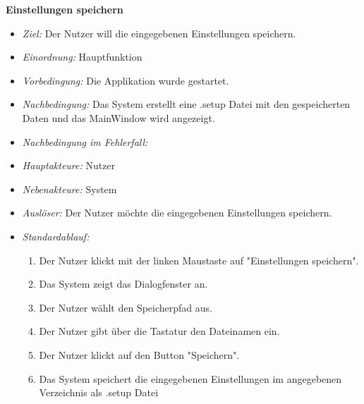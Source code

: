 \textbf{Einstellungen speichern}
  \begin{itemize}
  \item \textit{Ziel:} Der Nutzer will die eingegebenen Einstellungen speichern.
  \item \textit{Einordnung:} Hauptfunktion
  \item \textit{Vorbedingung:} Die Applikation wurde gestartet.
  \item \textit{Nachbedingung:} Das System erstellt eine .setup Datei mit den gespeicherten Daten und das MainWindow wird angezeigt.
    \item \textit{Nachbedingung im Fehlerfall:}
  \item \textit{Hauptakteure:} Nutzer
  \item \textit{Nebenakteure:} System
  \item \textit{Ausl\"oser:} Der Nutzer m\"ochte die eingegebenen Einstellungen speichern.
    \item \textit{Standardablauf:}
    \begin{enumerate}
    \item Der Nutzer klickt mit der linken Maustaste auf "Einstellungen speichern".
    \item Das System zeigt das Dialogfenster an.
    \item Der Nutzer w\"ahlt den Speicherpfad aus.
    \item Der Nutzer gibt \"uber die Tastatur den Dateinamen ein.
    \item Der Nutzer klickt auf den Button "Speichern".
    \item Das System speichert die eingegebenen  Einstellungen im angegebenen Verzeichnis als .setup Datei
  \end{enumerate}
  \end{itemize}